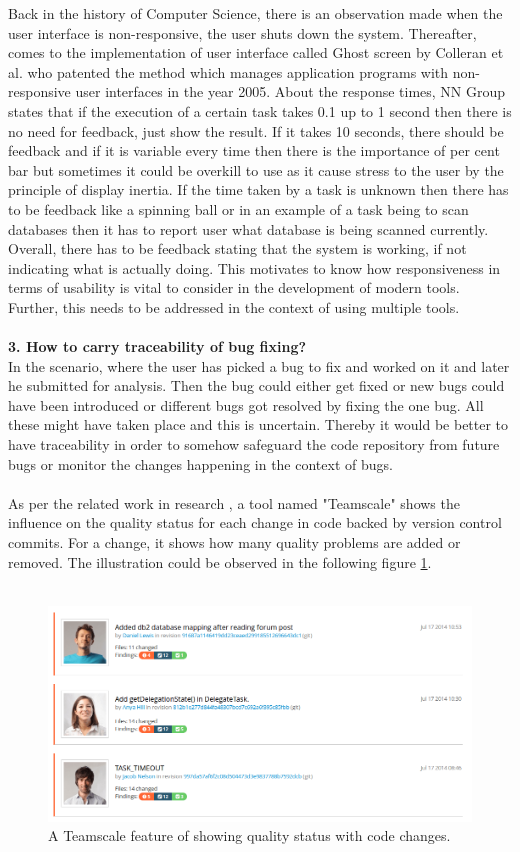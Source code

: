 Back in the history of Computer Science, there is an observation made when the user interface is non-responsive, the user shuts down the system. Thereafter, comes to the implementation of user interface called Ghost screen by Colleran et al. \cite{colleran} who patented the method which manages application programs with non-responsive user interfaces in the year 2005. About the response times, NN Group \cite{nn} states that if the execution of a certain task takes 0.1 up to 1 second then there is no need for feedback, just show the result. If it takes 10 seconds, there should be feedback and if it is variable every time then there is the importance of per cent bar \cite{Borman} but sometimes it could be overkill to use as it cause stress to the user by the principle of display inertia. If the time taken by a task is unknown then there has to be feedback like a spinning ball or in an example of a task being to scan databases then it has to report user what database is being scanned currently. Overall, there has to be feedback stating that the system is working, if not indicating what is actually doing. This motivates to know how responsiveness in terms of usability is vital to consider in the development of modern tools. Further, this needs to be addressed in the context of using multiple tools.\\ \\


\textbf{3. How to carry traceability of bug fixing?} \\

In the scenario, where the user has picked a bug to fix and worked on it and later he submitted for analysis. Then the bug could either get fixed or new bugs could have been introduced or different bugs got resolved by fixing the one bug. All these might have taken place and this is uncertain. Thereby it would be better to have traceability in order to somehow safeguard the code repository from future bugs or monitor the changes happening in the context of bugs. \\ \\

As per the related work in research \cite{heinemann2014teamscale}, a tool named "Teamscale" \cite{teamscale} shows the influence on the quality status for each change in code backed by version control commits. For a change, it shows how many quality problems are added or removed. The illustration could be observed in the following figure \ref{fig:teamscale}.\\ \\

\begin{figure}[hbt!]
	\centering
	\includegraphics[width=\linewidth]{figures/teamscale}
	\caption{A Teamscale feature of showing quality status with code changes.}
	\label{fig:teamscale}
\end{figure}

\let\cleardoublepage\clearpage
